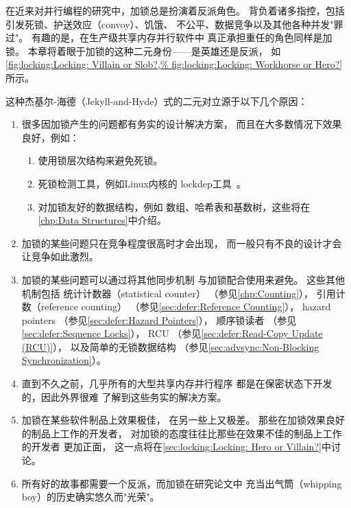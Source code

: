 
%

在近来对并行编程的研究中，加锁总是扮演着反派角色。
背负着诸多指控，包括引发死锁、护送效应（convoy）、饥饿、
不公平、数据竞争以及其他各种并发"罪过"。
有趣的是，在生产级共享内存并行软件中
真正承担重任的角色同样是加锁。
本章将着眼于加锁的这种二元身份——是英雄还是反派，
如
\cref{fig:locking:Locking: Villain or Slob?,%
fig:locking:Locking: Workhorse or Hero?}
所示。

这种杰基尔-海德（Jekyll-and-Hyde）式的二元对立源于以下几个原因：

\begin{enumerate}
\item	很多因加锁产生的问题都有务实的设计解决方案，
	而且在大多数情况下效果良好，例如：
	\begin{enumerate}
	\item	使用锁层次结构来避免死锁。
	\item	死锁检测工具，例如Linux内核的
		lockdep工具~\cite{JonathanCorbet2006lockdep}。
	\item	对加锁友好的数据结构，例如
		数组、哈希表和基数树，这些将在
		\cref{chp:Data Structures}中介绍。
	\end{enumerate}
\item	加锁的某些问题只在竞争程度很高时才会出现，
	而一般只有不良的设计才会让竞争如此激烈。
\item	加锁的某些问题可以通过将其他同步机制
	与加锁配合使用来避免。
	这些其他机制包括
	统计计数器（statistical counter）
	（参见\cref{chp:Counting}），
	引用计数（reference counting）
	（参见\cref{sec:defer:Reference Counting}），
	hazard pointers
	（参见\cref{sec:defer:Hazard Pointers}），
	顺序锁读者
	（参见\cref{sec:defer:Sequence Locks}），
	RCU
	（参见\cref{sec:defer:Read-Copy Update (RCU)}），
	以及简单的无锁数据结构
	（参见\cref{sec:advsync:Non-Blocking Synchronization}）。
\item	直到不久之前，几乎所有的大型共享内存并行程序
	都是在保密状态下开发的，因此外界很难
	了解到这些务实的解决方案。
\item	加锁在某些软件制品上效果极佳，
	在另一些上又极差。
	那些在加锁效果良好的制品上工作的开发者，
	对加锁的态度往往比那些在效果不佳的制品上工作的开发者
	更加正面，
	这一点将在\cref{sec:locking:Locking: Hero or Villain?}中讨论。
\item	所有好的故事都需要一个反派，而加锁在研究论文中
	充当出气筒（whipping boy）的历史确实悠久而"光荣"。
\end{enumerate}

